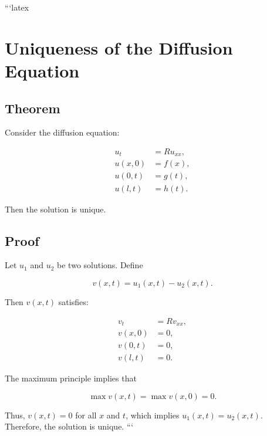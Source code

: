 ```latex
\section*{Uniqueness of the Diffusion Equation}

\subsection*{Theorem}

Consider the diffusion equation:

\begin{align*}
    u_t &= R u_{xx}, \\
    u(x,0) &= f(x), \\
    u(0,t) &= g(t), \\
    u(l,t) &= h(t).
\end{align*}

Then the solution is unique.

\subsection*{Proof}

Let \( u_1 \) and \( u_2 \) be two solutions. Define

\[
v(x,t) = u_1(x,t) - u_2(x,t).
\]

Then \( v(x,t) \) satisfies:

\begin{align*}
    v_t &= R v_{xx}, \\
    v(x,0) &= 0, \\
    v(0,t) &= 0, \\
    v(l,t) &= 0.
\end{align*}

The maximum principle implies that

\[
\max v(x,t) = \max v(x,0) = 0.
\]

Thus, \( v(x,t) = 0 \) for all \( x \) and \( t \), which implies \( u_1(x,t) = u_2(x,t) \). Therefore, the solution is unique.
```
